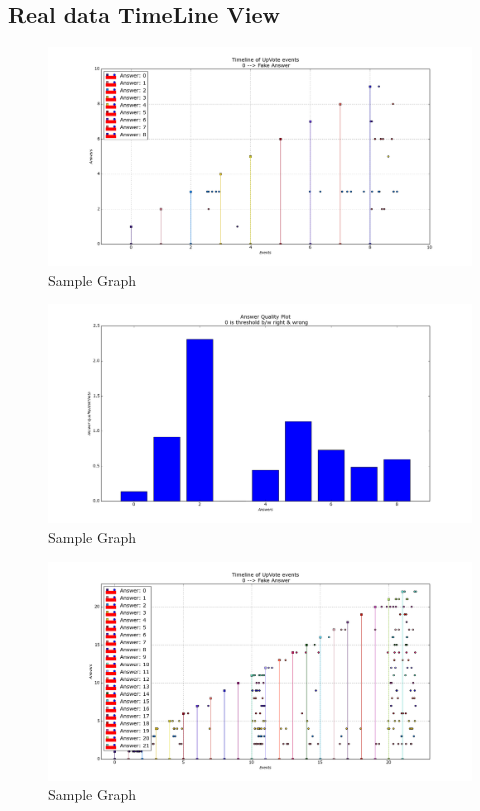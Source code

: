 \documentclass{article}
\begin{document}
\subsection{Real data TimeLine View}
\begin{figure}[H]
\centering
\includegraphics[width=12cm]{results_ver2/downVote_TL.png}
\caption{Sample Graph}
\label{fig1:overview}
\end{figure}
\begin{figure}[H]
\centering
\includegraphics[width=12cm]{results_ver2/downVote_SOL.png}
\caption{Sample Graph}
\label{fig1:overview}
\end{figure}
\begin{figure}[H]
\centering
\includegraphics[width=12cm]{results_ver2/longVote_TL.png}
\caption{Sample Graph}
\label{fig1:overview}
\end{figure}
\end{document}
